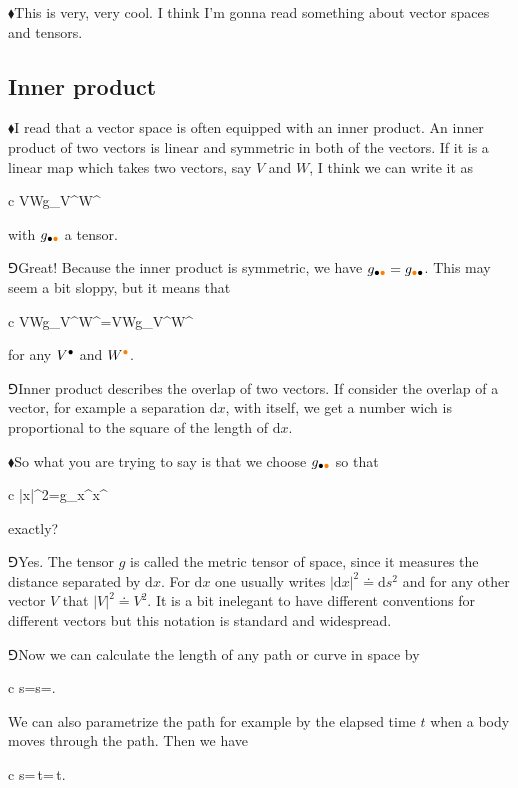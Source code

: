 \documentclass[10pt,oneside%
]{memoir}
\newenvironment{eqna}{\begin{IEEEeqnarray*}{c}}{\end{IEEEeqnarray*}\ignorespacesafterend}
\newcommand{\der}[2]{\frac{\dd#1}{\dd#2}}
\newcommand{\dd}{\mathrm{d}}
\newcommand{\coa}{{\color{black}\bullet}}
\newcommand{\cob}{{\color{oranssi}\bullet}}
\newcommand{\hea}{\(\blacklozenge\)\;}
\newcommand{\heb}{\(\Game\)\;}
\begin{document}
\hea This is very, very cool. I think I'm gonna read something about vector spaces and tensors.
\subsection{Inner product}
\hea I read that a vector space is often equipped with an inner product. An inner product of two vectors is linear and symmetric in both of the vectors. If it is a linear map which takes two vectors, say \(V\) and \(W\), I think we can write it as
\begin{eqna}
    V\cdot W\doteq g_{\coa\cob}V^\coa W^\cob
\end{eqna}
with \(g_{\coa\cob}\) a tensor.

\heb Great! Because the inner product is symmetric, we have \(g_{\coa\cob}=g_{\cob\coa}\). This may seem a bit sloppy, but it means that
\begin{eqna}
    V\cdot W\doteq g_{\coa\cob}V^\coa W^\cob=V\cdot W\doteq g_{\cob\coa}V^\coa W^\cob
\end{eqna}
for any \(V^\coa\) and \(W^\cob\).

\heb Inner product describes the overlap of two vectors. If consider the overlap of a vector, for example a separation \(\dd x\), with itself, we get a number wich is proportional to the square of the length of \(\dd x\).

\hea So what you are trying to say is that we choose \(g_{\coa\cob}\) so that
\begin{eqna}
    |\dd x|^2=g_{\coa\cob}\dd x^\coa\dd x^\cob
\end{eqna}
exactly?

\heb Yes. The tensor \(g\) is called the metric tensor of space, since it measures the distance separated by \(\dd x\). For \(\dd x\) one usually writes \(|\dd x|^2\doteq\dd s^2\) and for any other vector \(V\) that \(|V|^2\doteq V^2\). It is a bit inelegant to have different conventions for different vectors but this notation is standard and widespread.

\heb Now we can calculate the length of any path or curve in space by
\begin{eqna}
    s=\int\dd s=\int\sqrt{g_{\coa\cob}\dd x^\coa\dd x^\cob}.
\end{eqna}
We can also parametrize the path for example by the elapsed time \(t\) when a body moves through the path. Then we have
\begin{eqna}
    s=\int\sqrt{g_{\coa\cob}\der{x^\coa}{t}\der{x^\cob}{t}}\,\dd t=\int\sqrt{g_{\coa\cob}\dot{x}^\coa\dot{x}^\cob}\,\dd t.
\end{eqna}
\end{document}

